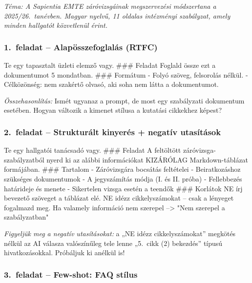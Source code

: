 \documentclass[11pt,a4paper]{article}
\begin{document}
\noindent\textit{Téma: A Sapientia EMTE záróvizsgáinak megszervezési
módszertana a 2025/26.\ tanévben. Magyar nyelvű, 11 oldalas intézményi
szabályzat, amely minden hallgatót közvetlenül érint.}

\bigskip

\subsubsection*{1.\ feladat -- Alapösszefoglalás (RTFC)}

\begin{prompt}
Te egy tapasztalt üzleti elemző vagy.
### Feladat
Foglald össze ezt a dokumentumot 5 mondatban.
### Formátum
- Folyó szöveg, felsorolás nélkül.
- Célközönség: nem szakértő olvasó, aki soha nem látta a dokumentumot.
\end{prompt}

\noindent\textit{Összehasonlítás:} Ismét ugyanaz a prompt, de most
egy szabályzati dokumentum esetében. Hogyan változik a kimenet stílusa
a kutatási cikkekhez képest?

\bigskip

\subsubsection*{2.\ feladat -- Strukturált kinyerés + negatív utasítások}

\begin{prompt}
Te egy hallgatói tanácsadó vagy.
### Feladat
A feltöltött záróvizsga-szabályzatból nyerd ki az alábbi információkat
KIZÁRÓLAG Markdown-táblázat formájában.
### Tartalom
- Záróvizsgára bocsátás feltételei
- Beiratkozáshoz szükséges dokumentumok
- A jegyszámítás módja (I. és II. próba)
- Fellebbezés határideje és menete
- Sikertelen vizsga esetén a teendők
### Korlátok
NE írj bevezető szöveget a táblázat elé.
NE idézz cikkelyszámokat -- csak a lényeget fogalmazd meg.
Ha valamely információ nem szerepel --> "Nem szerepel a szabályzatban"
\end{prompt}

\noindent\textit{Figyeljük meg a negatív utasításokat:}
a „NE idézz cikkelyszámokat” megkötés nélkül az AI válasza
valószínűleg tele lenne „5.\ cikk (2) bekezdés” típusú hivatkozásokkal.
Próbáljuk ki anélkül is!

\bigskip

\subsubsection*{3.\ feladat -- Few-shot: FAQ stílus}
\end{document}
